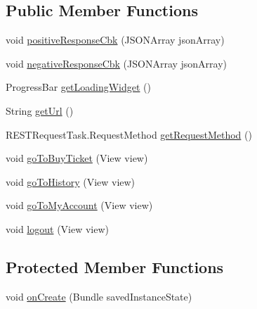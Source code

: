 \subsection*{Public Member Functions}
\begin{DoxyCompactItemize}
\item 
void \hyperlink{classcom_1_1bartekcios_1_1ticketsclient_1_1_main_activity_a0c44c46c29fb27debcc210af8b4c79f0}{positive\+Response\+Cbk} (J\+S\+O\+N\+Array json\+Array)
\item 
void \hyperlink{classcom_1_1bartekcios_1_1ticketsclient_1_1_main_activity_a901a7f1fcf07f1d7381cf45e6800d8f5}{negative\+Response\+Cbk} (J\+S\+O\+N\+Array json\+Array)
\item 
Progress\+Bar \hyperlink{classcom_1_1bartekcios_1_1ticketsclient_1_1_main_activity_a71f7b835ae25d0ababb77617c2051753}{get\+Loading\+Widget} ()
\item 
String \hyperlink{classcom_1_1bartekcios_1_1ticketsclient_1_1_main_activity_a7661600c51d0a7e9c57438d8ea427880}{get\+Url} ()
\item 
R\+E\+S\+T\+Request\+Task.\+Request\+Method \hyperlink{classcom_1_1bartekcios_1_1ticketsclient_1_1_main_activity_a63250038c650451726ffffa6ae2d2680}{get\+Request\+Method} ()
\item 
void \hyperlink{classcom_1_1bartekcios_1_1ticketsclient_1_1_main_activity_aff7d9712a4d771c33d3d74ba016b7f7f}{go\+To\+Buy\+Ticket} (View view)
\item 
void \hyperlink{classcom_1_1bartekcios_1_1ticketsclient_1_1_main_activity_a2e7be2eae63fe75892f659fdaaaa5162}{go\+To\+History} (View view)
\item 
void \hyperlink{classcom_1_1bartekcios_1_1ticketsclient_1_1_main_activity_a2215e62de072d5d191c26e1288cbb1db}{go\+To\+My\+Account} (View view)
\item 
void \hyperlink{classcom_1_1bartekcios_1_1ticketsclient_1_1_main_activity_a299fa18f68dddb271d023eceaa6ddcc0}{logout} (View view)
\end{DoxyCompactItemize}
\subsection*{Protected Member Functions}
\begin{DoxyCompactItemize}
\item 
void \hyperlink{classcom_1_1bartekcios_1_1ticketsclient_1_1_main_activity_abb8da6abefdc5a7e1bb13d1b4e7909a1}{on\+Create} (Bundle saved\+Instance\+State)
\end{DoxyCompactItemize}


